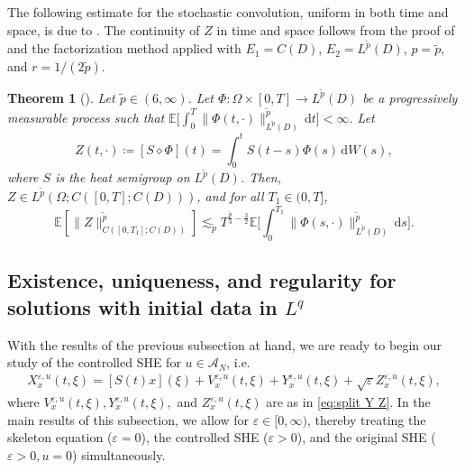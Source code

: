 \documentclass[10pt,a4paper]{amsart}
\newtheorem{theorem}{Theorem}[section]
\numberwithin{equation}{section}
\newcommand{\ceqq}{\coloneqq}
\newcommand{\col}{\colon}
\newcommand{\E}{{\mathbb E}}
\newcommand{\eps}{\varepsilon}
\newcommand{\Om}{\Omega}
\newcommand{\A}{{\mathcal A}}
\newcommand{\dd}{\,\mathrm{d}}
\begin{document}
The following estimate for the stochastic convolution, uniform in both time and space, is due to \cite[Th.\ 1.2]{Salins25SHE}. 
The continuity of $Z$ in time and space  follows from
the proof of \cite[Th.\ 1.2]{Salins25SHE} and the factorization method    
\cite[Prop.\ 5.9, Th.\ 5.10]{daprato} applied with $E_1=C(D)$, $E_2=L^{\tilde p}(D)$, $p=\tilde p$, and $r=1/(2\tilde p)$. 

\begin{theorem}[{\cite[Th.\ 1.2]{Salins25SHE}}]\label{th:stoch conv C}
    Let ${\tilde p}\in (6,\infty)$. Let $\Phi\col \Om\times [0,T]\to L^{\tilde p}(D)$ be a progressively measurable process  such that
$\E\big[\int_0^T \|\Phi(t,\cdot)\|_{L^{\tilde p}(D)}^{\tilde p}\dd t\big] <  \infty$. 
Let
\begin{equation*}
Z(t,\cdot)\ceqq [S\diamond \Phi](t)=\int_0^tS(t-s)\Phi(s)\dd W(s), 
\end{equation*}
where $S$ is the heat semigroup on $L^{\tilde p}(D)$. 
Then, $Z\in L^{\tilde p}(\Om;C([0,T];C(D)))$, and for all $T_1\in(0,T]$,  
\begin{equation*}
    \E[\|Z\|_{C([0,T_1];C(D))}^{\tilde p}]\lesssim_{\tilde p}T^{\frac{\tilde p}{4} - \frac{3}{2}} \E\Big[ \int_0^{T_1} \|\Phi(s,\cdot)\|_{L^{\tilde p}(D)}^{\tilde p}\dd s\Big].
\end{equation*}
\end{theorem}



\subsection{Existence, uniqueness, and regularity for solutions with initial data in $L^q$}\label{sub:wpn}

With the results of the previous subsection at hand, we are ready to begin our study of the controlled SHE for $u\in \A_N$, i.e. 
\begin{align*} 
  X_x^{\eps,u}(t,\xi) = [S(t)x](\xi)+V^{\eps,u}_x(t,\xi)+Y_x^{\eps,u}(t,\xi)+\sqrt{\eps}Z_x^{\eps,u}(t,\xi),
\end{align*}
where $V^{\eps,u}_x(t,\xi) , 
  Y_x^{\eps,u}(t,\xi),$ and $
  Z_x^{\eps,u}(t,\xi)$ are as in \eqref{eq:split Y Z}.  
In the main results of this subsection, we allow for $\eps\in[0,\infty)$, thereby treating the skeleton equation ($\eps=0$), the controlled SHE ($\eps>0$), and the original SHE ($\eps>0,u=0$) simultaneously.
\end{document}

